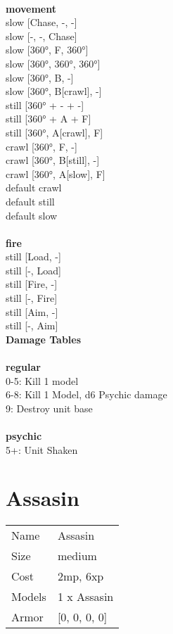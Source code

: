 \ \\ {\bf movement } \\
slow [Chase, -, -] \\
slow [-, -, Chase] \\
slow [360°, F, 360°] \\
slow [360°, 360°, 360°] \\
slow [360°, B, -] \\
slow [360°, B[crawl], -] \\
still [360° + - + -] \\
still [360° + A + F] \\
still [360°, A[crawl], F] \\
crawl [360°, F, -] \\
crawl [360°, B[still], -] \\
crawl [360°, A[slow], F] \\
default crawl \\
default still \\
default slow \\
\ \\ {\bf fire } \\
still [Load, -] \\
still [-, Load] \\
still [Fire, -] \\
still [-, Fire] \\
still [Aim, -] \\
still [-, Aim] \\


{\bf Damage Tables} \\
\ \\ {\bf regular } \\
0-5: Kill 1 model \\
6-8: Kill 1 Model, d6 Psychic damage \\
9: Destroy unit base \\
\ \\ {\bf psychic } \\
5+: Unit Shaken \\










\pagebreak\pagebreak

\section{ Assasin }

\begin{tabular}{ll}
  Name & Assasin \\
  Size & medium\\
  Cost & 2mp, 6xp\\
  Models & 1 x Assasin\\
  Armor & [0, 0, 0, 0]\\
\end{tabular}


